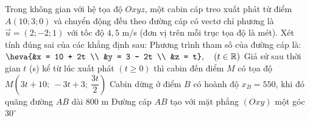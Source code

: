 \begin{ex}%
	Trong không gian với hệ tọa độ $Oxyz$, một cabin cáp treo xuất phát từ điểm $A(10;3;0)$ và chuyển động đều theo đường cáp có vectơ chỉ  phương là $\overrightarrow{u} = (2;-2;1)$ với tốc độ $4{,}5$ m/s (đơn vị trên mỗi trục tọa độ là mét).
	\noindent Xét tính đúng sai của các khẳng định  sau:
	\choiceTF 
		{\True Phương trình tham số của đường cáp là: $\heva{&x = 10  + 2t \\ &y = 3 - 2t \\ &z = t}, \quad (t \in \mathbb{R})$}
		{\True Giả sử sau thời gian $t$ (s) kể từ lúc xuất phát $(t \ge 0)$ thì cabin đến điểm $M$ có tọa độ $M\left(3t  + 10;\ -3t + 3;\ \dfrac{3t}{2}\right)$}
		{Cabin dừng ở điểm $B$ có hoành độ $x_B =  550$, khi đó quãng đường $AB$ dài $800$ m}
		{\True Đường cáp $AB$  tạo với mặt phẳng $(Oxy)$ một góc $30^\circ$}
\end{ex}

